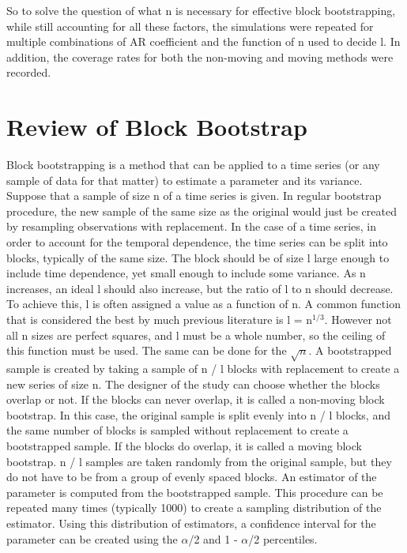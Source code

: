 \documentclass[12pt, letterpaper, titlepage]{article}
\begin{document}
So to solve the question of what n is necessary for effective block bootstrapping,
while still accounting for all these factors, the simulations were repeated for
multiple combinations of AR coefficient and the function of n used to decide l. In 
addition, the coverage rates
for both the non-moving and moving methods were recorded.

\section{Review of Block Bootstrap}
\label{sec:blkbootreview}

Block bootstrapping is a method that can be applied to a time series (or any sample of data for that matter) to estimate a parameter and its variance. Suppose that a sample of size n of a time series is given. In regular bootstrap procedure, the new sample of the same size as the original would just be created by resampling observations with replacement. In the case of a time series, in order to account for the temporal dependence, the time series can be split into blocks, typically of the same size. The block should be of size l large enough to include time dependence, yet small enough to include some variance. As n increases, an ideal l should also increase, but the ratio of l to n should decrease. To achieve this, l is often assigned a value as a function of n. A common function that is considered the best by much previous literature is l = n$^{1/3}$. However not all n sizes are perfect squares, and l must be a whole number, so the ceiling of this function must be used. The same can be done for the $\sqrt{n}$. A bootstrapped sample is created by taking a sample of n / l blocks with replacement to create a new series of size n. The designer of the study can choose whether the blocks overlap or not. If the blocks can never overlap, it is called a non-moving block bootstrap. In this case, the original sample is split evenly into n / l blocks, and the same number of blocks is sampled without replacement to create a bootstrapped sample. If the blocks do overlap, it is called a moving block bootstrap. n / l samples are taken randomly from the original sample, but they do not have to be from a group of evenly spaced blocks. An estimator of the parameter is computed from the bootstrapped sample. This procedure can be repeated many times (typically 1000) to create a sampling distribution of the estimator. Using this distribution of estimators, a confidence interval for the parameter can be created using the $\alpha$/2 and 1 - $\alpha$/2 percentiles.
\end{document}
